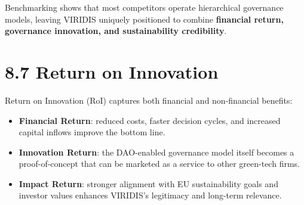 \documentclass[
  english,
  12pt,
  oneside,
  open=any]{scrbook}
\providecommand{\tightlist}{%
  \setlength{\itemsep}{0pt}\setlength{\parskip}{0pt}}\usepackage{longtable,booktabs,array}
\begin{document}
Benchmarking shows that most competitors operate hierarchical governance
models, leaving VIRIDIS uniquely positioned to combine \textbf{financial
return, governance innovation, and sustainability credibility}.

\section{8.7 Return on Innovation}\label{sec-roi}

Return on Innovation (RoI) captures both financial and non-financial
benefits:

\begin{itemize}
\tightlist
\item
  \textbf{Financial Return}: reduced costs, faster decision cycles, and
  increased capital inflows improve the bottom line.\\
\item
  \textbf{Innovation Return}: the DAO-enabled governance model itself
  becomes a proof-of-concept that can be marketed as a service to other
  green-tech firms.\\
\item
  \textbf{Impact Return}: stronger alignment with EU sustainability
  goals and investor values enhances VIRIDIS's legitimacy and long-term
  relevance.
\end{itemize}
\end{document}
